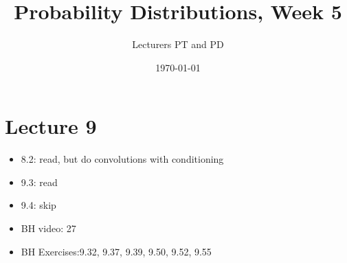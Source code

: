 \documentclass[a4paper,11pt]{article}
\author{Lecturers PT and PD
}
\date{\today}
\title{Probability Distributions, Week 5}
\begin{document}
\maketitle
\tableofcontents

\section{Lecture 9}
\label{sec:lecture-1}

\begin{itemize}
\item 8.2: read, but do convolutions with conditioning
\item 9.3: read
\item 9.4: skip
\item BH video: 27
\item BH Exercises:9.32, 9.37, 9.39, 9.50, 9.52, 9.55
\end{itemize}
\end{document}
